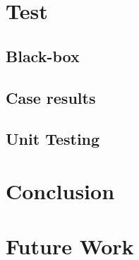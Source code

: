 \chapter{Test}
\section{Black-box}

\section*{Case results}

\section{Unit Testing}



\chapter{Conclusion}
\label{chap:conclusion}

\chapter{Future Work}


\begin{appendices}


\label{appendixEnd}
\end{appendices}

\cleardoublepage
\listoffigures*


\cleardoublepage
\renewcommand{\lstlistlistingname}{List of Listings}%
\lstlistoflistings

\cleardoublepage
{}
\label{chap:bib}%


\label{lastpage}%

\ifthenelse{\isodd{\pageref{lastpage}}}
{%
}
{%
\pagebreak
\thispagestyle{empty}
\mbox{}
}


